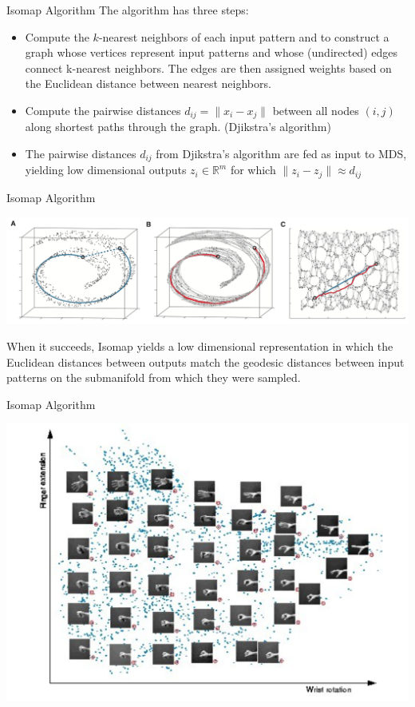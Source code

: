 \documentclass[xcolor={dvipsnames,table}]{beamer}
\begin{document}
\begin{frame}{Isomap Algorithm}
	The algorithm has three steps:
	\begin{itemize}
		\item Compute the $k$-nearest neighbors of each input pattern and to construct a graph whose vertices represent input patterns and whose (undirected) edges connect k-nearest neighbors. The edges are then assigned weights based on the Euclidean distance between nearest neighbors.
	 	\item Compute the pairwise distances $d_{ij} = \lVert x_{i} - x_{j}\rVert$ between all nodes $(i,j)$ along shortest paths through the graph. (Djikstra’s algorithm)
	 	\item The pairwise distances $d_{ij}$ from Djikstra’s algorithm are fed as input to MDS, yielding low dimensional outputs $z_{i} \in \mathbb{R}^m$ for which $\lVert z_{i} - z_{j}\rVert \approx d_{ij}$
	 \end{itemize}
\end{frame}


\begin{frame}{Isomap Algorithm}
	\begin{center}
     	\includegraphics[width=\linewidth]{isosummary.png}
     \end{center}
    When it succeeds, Isomap yields a low dimensional representation in which the Euclidean distances between outputs match the geodesic distances between input patterns on the submanifold from which they were sampled.
\end{frame}

\begin{frame}{Isomap Algorithm}
	\begin{center}
     	\includegraphics[width=\linewidth]{handresults.png}
     \end{center}
\end{frame}
\end{document}
